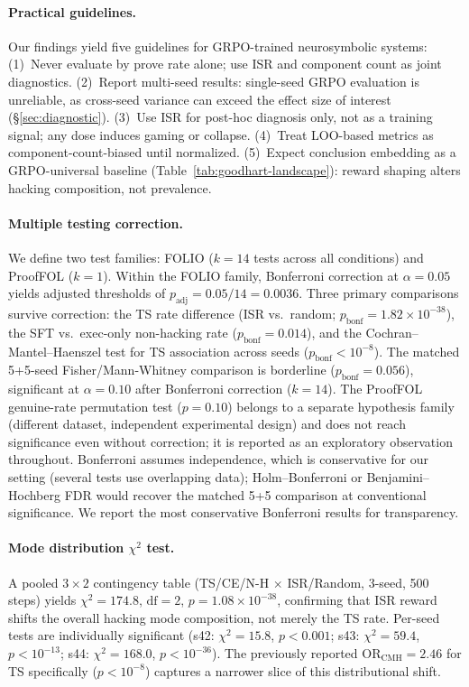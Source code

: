 \paragraph{Practical guidelines.}
\label{app:practical-guidelines}
Our findings yield five guidelines for GRPO-trained neurosymbolic systems:
(1)~Never evaluate by prove rate alone; use ISR and component count as joint diagnostics.
(2)~Report multi-seed results: single-seed GRPO evaluation is unreliable, as cross-seed variance can exceed the effect size of interest (\S\ref{sec:diagnostic}).
(3)~Use ISR for post-hoc diagnosis only, not as a training signal; any dose induces gaming or collapse.
(4)~Treat LOO-based metrics as component-count-biased until normalized.
(5)~Expect conclusion embedding as a GRPO-universal baseline (Table~\ref{tab:goodhart-landscape}): reward shaping alters hacking composition, not prevalence.

\paragraph{Multiple testing correction.}
\label{app:statistical-details}
We define two test families: FOLIO ($k{=}14$ tests across all conditions) and ProofFOL ($k{=}1$).
Within the FOLIO family, Bonferroni correction at $\alpha{=}0.05$ yields adjusted thresholds of $p_{\text{adj}}{=}0.05/14{=}0.0036$.
Three primary comparisons survive correction: the TS rate difference (ISR vs.\ random; $p_{\text{bonf}}{=}1.82{\times}10^{-38}$), the SFT vs.\ exec-only non-hacking rate ($p_{\text{bonf}}{=}0.014$), and the Cochran--Mantel--Haenszel test for TS association across seeds ($p_{\text{bonf}}{<}10^{-8}$).
The matched 5+5-seed Fisher/Mann-Whitney comparison is borderline ($p_{\text{bonf}}{=}0.056$), significant at $\alpha{=}0.10$ after Bonferroni correction ($k{=}14$).
The ProofFOL genuine-rate permutation test ($p{=}0.10$) belongs to a separate hypothesis family (different dataset, independent experimental design) and does not reach significance even without correction; it is reported as an exploratory observation throughout.
Bonferroni assumes independence, which is conservative for our setting (several tests use overlapping data); Holm--Bonferroni or Benjamini--Hochberg FDR would recover the matched 5+5 comparison at conventional significance.
We report the most conservative Bonferroni results for transparency.

\paragraph{Mode distribution $\chi^2$ test.}
A pooled $3{\times}2$ contingency table (TS/CE/N-H $\times$ ISR/Random, 3-seed, 500 steps) yields $\chi^2{=}174.8$, $\text{df}{=}2$, $p{=}1.08{\times}10^{-38}$, confirming that ISR reward shifts the overall hacking mode composition, not merely the TS rate.
Per-seed tests are individually significant (s42: $\chi^2{=}15.8$, $p{<}0.001$; s43: $\chi^2{=}59.4$, $p{<}10^{-13}$; s44: $\chi^2{=}168.0$, $p{<}10^{-36}$).
The previously reported $\text{OR}_{\text{CMH}}{=}2.46$ for TS specifically ($p{<}10^{-8}$) captures a narrower slice of this distributional shift.


